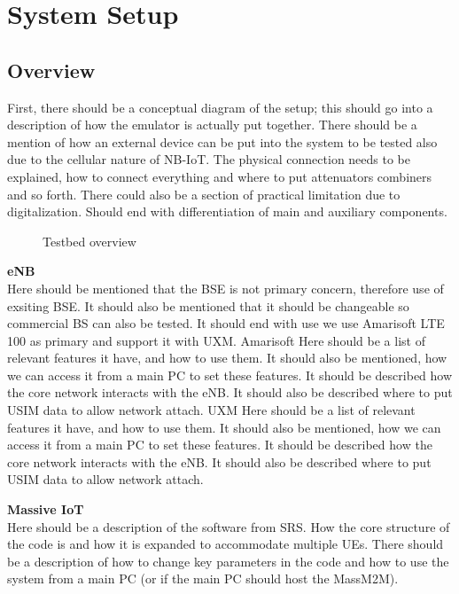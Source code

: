 \chapter{System Setup}

\section{Overview}

First, there should be a conceptual diagram of the setup; this should go into a description of how the emulator is actually put together. 
There should be a mention of how an external device can be put into the system to be tested also due to the cellular nature of NB-IoT.
The physical connection needs to be explained, how to connect everything and where to put attenuators combiners and so forth.
There could also be a section of practical limitation due to digitalization.
Should end with differentiation of main and auxiliary components.

\begin{figure}[H]
\centering
\resizebox{0.5\textwidth}{!}{
}
\caption{Testbed overview}
\label{fig:test-bed_overview}
\end{figure}

\textbf{eNB}\\
Here should be mentioned that the BSE is not primary concern, therefore use of exsiting BSE. It should also be mentioned that it should be changeable so commercial BS can also be tested. It should end with use we use Amarisoft LTE 100 as primary and support it with UXM.
	Amarisoft
Here should be a list of relevant features it have, and how to use them. It should also be mentioned, how we can access it from a main PC to set these features. It should be described how the core network interacts with the eNB. It should also be described where to put USIM data to allow network attach.
	UXM
	Here should be a list of relevant features it have, and how to use them. It should also be mentioned, how we can access it from a main PC to set these features. It should be described how the core network interacts with the eNB. It should also be described where to put USIM data to allow network attach.

\textbf{Massive IoT}\\
Here should be a description of the software from SRS. How the core structure of the code is and how it is expanded to accommodate multiple UEs. There should be a description of how to change key parameters in the code and how to use the system from a main PC (or if the main PC should host the MassM2M).

